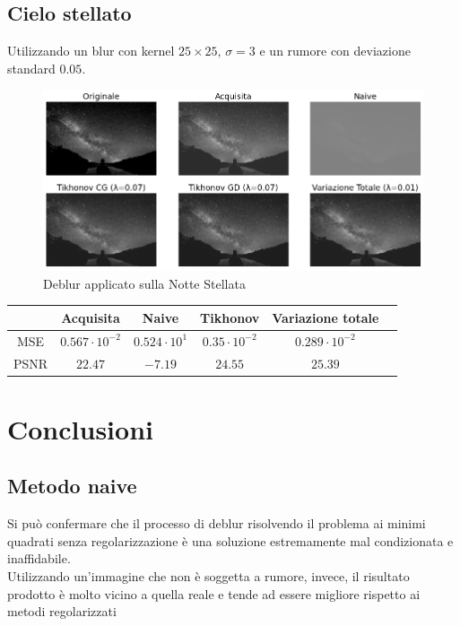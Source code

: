 \documentclass[11pt]{article}
\begin{document}
\subsection{Cielo stellato}
Utilizzando un blur con kernel $25 \times 25$, $\sigma=3$ e un rumore con deviazione standard $0.05$.
\begin{figure}[H]
    \centering
    \includegraphics[width=15cm]{reale/2/deblur.png}
    \caption{Deblur applicato sulla Notte Stellata}
    \label{fig:deblur_reale2}
\end{figure}
\begin{center}
    \begin{tabular}{ |c|c|c|c|c|c| }
    \hline
    & Acquisita & Naive & Tikhonov & Variazione totale \\ 
    \hline
    MSE & $0.567 \cdot 10^{-2}$ & $0.524 \cdot 10^{1}$ & $0.35 \cdot 10^{-2}$ & $0.289 \cdot 10^{-2}$ \\ 
    PSNR & $22.47$ & $-7.19$ & $24.55$ & $25.39$ \\ 
    \hline
    \end{tabular}
\end{center}




\section{Conclusioni}
\subsection{Metodo naive}
Si può confermare che il processo di deblur risolvendo il problema ai minimi quadrati senza regolarizzazione è una soluzione estremamente mal condizionata e inaffidabile.\\
Utilizzando un'immagine che non è soggetta a rumore, invece, il risultato prodotto è molto vicino a quella reale e tende ad essere migliore rispetto ai metodi regolarizzati
\end{document}
